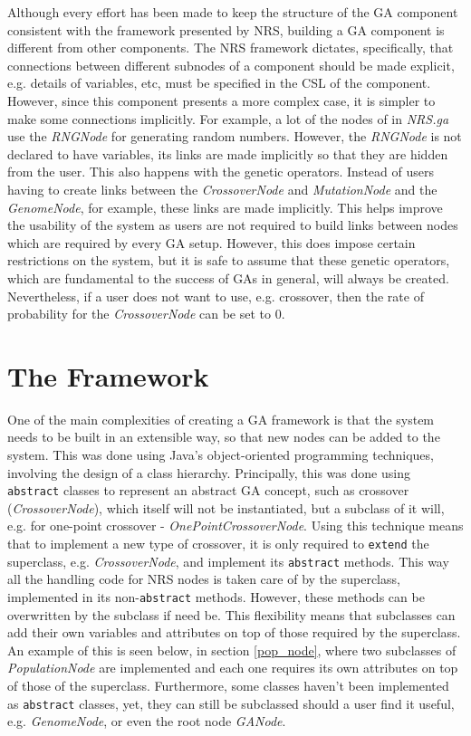 \documentclass[10pt, notitlepage, a4paper]{article}
\begin{document}
Although every effort has been made to keep the structure of the GA component consistent with the framework presented by NRS, building a GA component is different from other components. The NRS framework dictates, specifically, that connections between different subnodes of a component should be made explicit, e.g. details of variables, etc, must be specified in the CSL of the component. However, since this component presents a more complex case, it is simpler to make some connections implicitly. For example, a lot of the nodes of in {\it NRS.ga} use the {\it RNGNode} for generating random numbers. However, the {\it RNGNode} is not declared to have variables, its links are made implicitly so that they are hidden from the user. This also happens with the genetic operators. Instead of users having to create links between the {\it CrossoverNode} and {\it MutationNode} and the {\it GenomeNode}, for example, these links are made implicitly. This helps improve the usability of the system as users are not required to build links between nodes which are required by every GA setup. However, this does impose certain restrictions on the system, but it is safe to assume that these genetic operators, which are fundamental to the success of GAs in general, will always be created. Nevertheless, if a user does not want to use, e.g. crossover, then the rate of probability for the {\it CrossoverNode} can be set to 0.

\section{The Framework}
One of the main complexities of creating a GA framework is that the system needs to be built in an extensible way, so that new nodes can be added to the system. This was done using Java's object-oriented programming techniques, involving the design of a class hierarchy. Principally, this was done using {\tt abstract} classes to represent an abstract GA concept, such as crossover ({\it CrossoverNode}), which itself will not be instantiated, but a subclass of it will, e.g. for one-point crossover - {\it OnePointCrossoverNode}. Using this technique means that to implement a new type of crossover, it is only required to {\tt extend} the superclass, e.g. {\it CrossoverNode}, and implement its {\tt abstract} methods. This way all the handling code for NRS nodes is taken care of by the superclass, implemented in its non-{\tt abstract} methods. However, these methods can be overwritten by the subclass if need be. This flexibility means that subclasses can add their own variables and attributes on top of those required by the superclass. An example of this is seen below, in section \ref{pop_node}, where two subclasses of {\it PopulationNode} are implemented and each one requires its own attributes on top of those of the superclass. Furthermore, some classes haven't been implemented as {\tt abstract} classes, yet, they can still be subclassed should a user find it useful, e.g. {\it GenomeNode}, or even the root node {\it GANode}.
\end{document}
